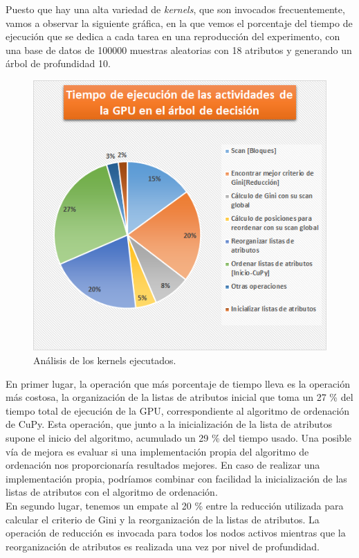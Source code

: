 Puesto que hay una alta variedad de \textit{kernels}, que son invocados frecuentemente, vamos a observar la siguiente gráfica, en la que vemos el porcentaje del tiempo de ejecución que se dedica a cada tarea en una reproducción del experimento, con una base de datos de 100000 muestras aleatorias con 18 atributos y generando un árbol de profundidad 10.

\begin{figure}[ht]
\centering
\includegraphics[scale=0.8]{imagenes/profiletreequesito.png}
\caption{Análisis de los kernels ejecutados.}
\label{img:quesito}
\end{figure}

En primer lugar, la operación que más porcentaje de tiempo lleva es la operación más costosa, la organización de la listas de atributos inicial que toma un 27 \% del tiempo total de ejecución de la GPU, correspondiente al algoritmo de ordenación de CuPy. Esta operación, que junto a la inicialización de la lista de atributos supone el inicio del algoritmo, acumulado un 29 \% del tiempo usado. Una posible vía de mejora es evaluar si una implementación propia del algoritmo de ordenación nos proporcionaría resultados mejores. En caso de realizar una implementación propia, podríamos combinar con facilidad la inicialización de las listas de atributos con el algoritmo de ordenación. \\

En segundo lugar, tenemos un empate al 20 \% entre la reducción utilizada para calcular el criterio de Gini y la reorganización de la listas de atributos. La operación de reducción es invocada para todos los nodos activos mientras que la reorganización de atributos es realizada una vez por nivel de profundidad. \\

